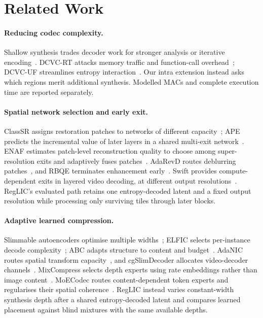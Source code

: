 \section{Related Work}
\label{sec:related}

\paragraph{Reducing codec complexity.}
Shallow synthesis trades decoder work for stronger analysis or iterative
encoding~\cite{yang2023shallow}. DCVC-RT attacks memory traffic and
function-call overhead~\cite{jia2025dcvcrt}; DCVC-UF streamlines
entropy interaction~\cite{li2026dcvcuf}. Our intra extension instead
asks which regions merit additional synthesis. Modelled MACs and
complete execution time are reported separately.

\paragraph{Spatial network selection and early exit.}
ClassSR assigns restoration patches to networks of different
capacity~\cite{kong2021classsr}; APE predicts the incremental value of
later layers in a shared multi-exit network~\cite{wang2022ape}.
ENAF estimates patch-level reconstruction quality to choose among
super-resolution exits and adaptively fuses patches~\cite{nguyen2025enaf}.
AdaRevD routes deblurring patches~\cite{mao2024adarevd}, and RBQE
terminates enhancement early~\cite{xing2020rbqe}. Swift provides
compute-dependent exits in layered video decoding, at different output
resolutions~\cite{dasari2022swift}. RegLIC's evaluated path retains one
entropy-decoded latent and a fixed output resolution while processing
only surviving tiles through later blocks.

\paragraph{Adaptive learned compression.}
Slimmable autoencoders optimise multiple widths~\cite{yang2021slimcae};
ELFIC selects per-instance decode complexity~\cite{zhang2023elfic};
ABC adapts structure to content and budget~\cite{zhang2025abc}.
AdaNIC routes spatial transform capacity~\cite{tao2023adanic}, and
cgSlimDecoder allocates video-decoder channels~\cite{hu2023cgslim}.
MixCompress selects depth experts using rate embeddings rather than
image content~\cite{ta2026mixcompress}. MoECodec routes content-dependent
token experts and regularises their spatial coherence~\cite{zhao2026moecodec}.
RegLIC instead varies constant-width synthesis depth after a shared
entropy-decoded latent and compares learned placement against blind
mixtures with the same available depths.

